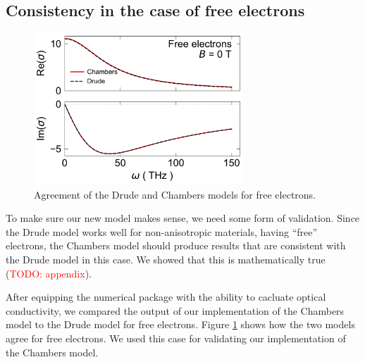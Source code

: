 \subsection{Consistency in the case of free electrons}
\begin{figure}
    \centering
    \includegraphics[width=0.7\textwidth]{figures/free_electrons}
    \caption{Agreement of the Drude and Chambers models for free electrons.}
    \label{fig:free_electrons}
\end{figure}

To make sure our new model makes sense, we need some form of validation. Since the Drude model works
well for non-anisotropic materials, having ``free'' electrons, the Chambers model should produce
results that are consistent with the Drude model in this case. We showed that this is mathematically
true (\textcolor{red}{TODO: appendix}).

After equipping the numerical package with the ability to cacluate optical conductivity, we compared
the output of our implementation of the Chambers model to the Drude model for free electrons. Figure
\ref{fig:free_electrons} shows how the two models agree for free electrons. We used this case for
validating our implementation of the Chambers model.